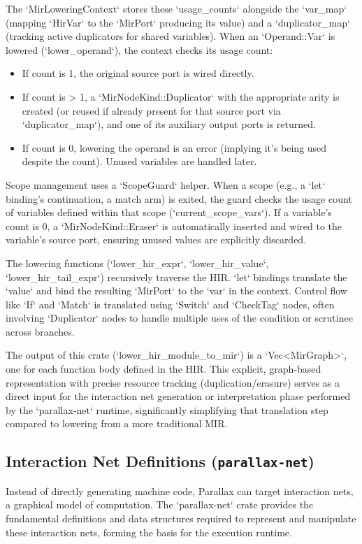 The `MirLoweringContext` stores these `usage_counts` alongside the `var_map` (mapping `HirVar` to the `MirPort` producing its value) and a `duplicator_map` (tracking active duplicators for shared variables). When an `Operand::Var` is lowered (`lower_operand`), the context checks its usage count:
\begin{itemize}
    \item If count is 1, the original source port is wired directly.
    \item If count is > 1, a `MirNodeKind::Duplicator` with the appropriate arity is created (or reused if already present for that source port via `duplicator_map`), and one of its auxiliary output ports is returned.
    \item If count is 0, lowering the operand is an error (implying it's being used despite the count). Unused variables are handled later.
\end{itemize}
Scope management uses a `ScopeGuard` helper. When a scope (e.g., a `let` binding's continuation, a match arm) is exited, the guard checks the usage count of variables defined within that scope (`current_scope_vars`). If a variable's count is 0, a `MirNodeKind::Eraser` is automatically inserted and wired to the variable's source port, ensuring unused values are explicitly discarded.

The lowering functions (`lower_hir_expr`, `lower_hir_value`, `lower_hir_tail_expr`) recursively traverse the HIR. `let` bindings translate the `value` and bind the resulting `MirPort` to the `var` in the context. Control flow like `If` and `Match` is translated using `Switch` and `CheckTag` nodes, often involving `Duplicator` nodes to handle multiple uses of the condition or scrutinee across branches.

The output of this crate (`lower_hir_module_to_mir`) is a `Vec<MirGraph>`, one for each function body defined in the HIR. This explicit, graph-based representation with precise resource tracking (duplication/erasure) serves as a direct input for the interaction net generation or interpretation phase performed by the `parallax-net` runtime, significantly simplifying that translation step compared to lowering from a more traditional MIR.

\subsection{Interaction Net Definitions (\texttt{parallax-net})} %
Instead of directly generating machine code, Parallax can target interaction nets, a graphical model of computation. The `parallax-net` crate provides the fundamental definitions and data structures required to represent and manipulate these interaction nets, forming the basis for the execution runtime.

